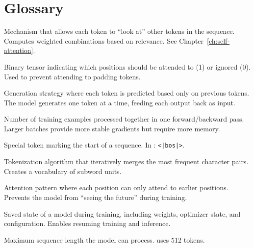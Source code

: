 \chapter{Glossary}
\label{app:glossary}

\begin{description}[style=nextline, leftmargin=2cm]

\item[Attention]
Mechanism that allows each token to ``look at'' other tokens in the sequence. Computes weighted combinations based on relevance. See Chapter~\ref{ch:self-attention}.

\item[Attention Mask]
Binary tensor indicating which positions should be attended to (1) or ignored (0). Used to prevent attending to padding tokens.

\item[Autoregressive]
Generation strategy where each token is predicted based only on previous tokens. The model generates one token at a time, feeding each output back as input.

\item[Batch Size]
Number of training examples processed together in one forward/backward pass. Larger batches provide more stable gradients but require more memory.

\item[BOS (Beginning of Sequence)]
Special token marking the start of a sequence. In \TryLM: \texttt{<|bos|>}.

\item[BPE (Byte Pair Encoding)]
Tokenization algorithm that iteratively merges the most frequent character pairs. Creates a vocabulary of subword units.

\item[Causal Masking]
Attention pattern where each position can only attend to earlier positions. Prevents the model from ``seeing the future'' during training.

\item[Checkpoint]
Saved state of a model during training, including weights, optimizer state, and configuration. Enables resuming training and inference.

\item[Context Length]
Maximum sequence length the model can process. \TryLM uses 512 tokens.


\end{description}
